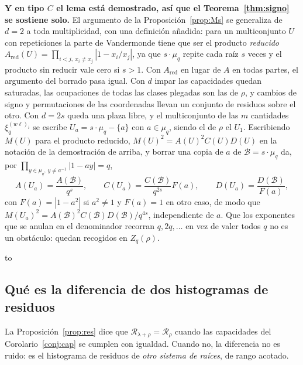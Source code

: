 \documentclass[11pt,a4paper]{article}
\newenvironment{keybox}
  {\par\vspace{9pt}\begin{lrbox}{\fichabox}%
   \begin{minipage}{0.90\textwidth}\vspace{7pt}\setlength{\parskip}{3pt}}
  {\vspace{7pt}\end{minipage}\end{lrbox}%
   \par\noindent\hbox to \textwidth{\hfill
   \textcolor{azul}{\rule[-\dp\fichabox]{3.2pt}{\dimexpr\ht\fichabox+\dp\fichabox\relax}}%
   \colorbox{fondoficha}{\usebox{\fichabox}}\hfill}%
   \par\vspace{9pt}}
\begin{document}
\begin{keybox}
\textbf{Y en tipo $C$ el lema está demostrado, así que el Teorema~\ref{thm:signo} se sostiene solo.}
El argumento de la Proposición~\ref{prop:Ms} se generaliza de $d=2$ a toda multiplicidad, con una
definición añadida: para un multiconjunto $U$ con repeticiones la parte de Vandermonde tiene que ser
el producto \emph{reducido} $A_{\mathrm{red}}(U)=\prod_{i<j,\ x_i\neq x_j}|1-x_i/x_j|$, ya que
$s\cdot\mu_q$ repite cada raíz $s$ veces y el producto sin reducir vale cero si $s>1$. Con
$A_{\mathrm{red}}$ en lugar de $A$ en todas partes, el argumento del borrado pasa igual. Con $d$
impar las capacidades quedan saturadas, las ocupaciones de todas las clases plegadas son las de
$\rho$, y cambios de signo y permutaciones de las coordenadas llevan un conjunto de residuos sobre el
otro. Con $d=2s$ queda una plaza libre, y el multiconjunto de las $m$ cantidades
$\xi_q^{(w\ell)_i}$ se escribe $U_a=s\cdot\mu_q-\{a\}$ con $a\in\mu_q$, siendo el de $\rho$ el
$U_1$. Escribiendo $M(U)$ para el producto reducido, $M(U)^2=A(U)^2C(U)D(U)$ en la notación de la
demostración de arriba, y borrar una copia de $a$ de $\mathcal B=s\cdot\mu_q$ da, por
$\prod_{y\in\mu_q,\,y\neq a^{-1}}|1-ay|=q$,
\[
A(U_a)=\frac{A(\mathcal B)}{q^{s}},\qquad
C(U_a)=\frac{C(\mathcal B)}{q^{2s}}F(a),\qquad
D(U_a)=\frac{D(\mathcal B)}{F(a)},
\]
con $F(a)=|1-a^2|$ si $a^2\neq1$ y $F(a)=1$ en otro caso, de modo que
$M(U_a)^2=A(\mathcal B)^2C(\mathcal B)D(\mathcal B)/q^{4s}$, independiente de $a$. Que los exponentes
que se anulan en el denominador recorran $q,2q,\dots$ en vez de valer todos $q$ no es un obstáculo:
quedan recogidos en $Z_q(\rho)$.
\end{keybox}

\subsection*{Qué es la diferencia de dos histogramas de residuos}

\noindent La Proposición~\ref{prop:res} dice que $\mathscr{R}_{\lambda+\rho}=\mathscr{R}_\rho$
cuando las capacidades del Corolario~\ref{conj:cap} se cumplen con igualdad. Cuando no, la
diferencia no es ruido: es el histograma de residuos de \emph{otro sistema de raíces}, de rango
acotado.
\end{document}
